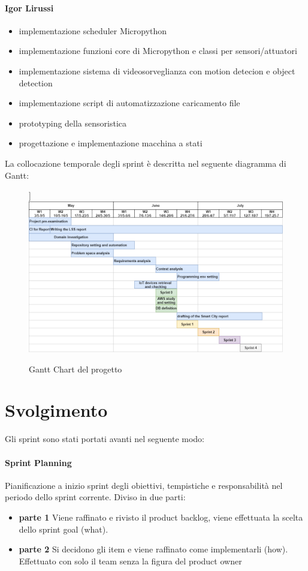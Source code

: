 \paragraph{Igor Lirussi}
\begin{itemize}
    \item implementazione scheduler Micropython
    \item implementazione funzioni core di Micropython e classi per sensori/attuatori
    \item implementazione sistema di videosorveglianza con motion detecion e object detection
    \item implementazione script di automatizzazione caricamento file
    \item prototyping della sensoristica
    \item progettazione e implementazione macchina a stati 
\end{itemize}
La collocazione temporale degli sprint è descritta nel seguente diagramma di Gantt: 
\begin{figure}[H]
    \caption{Gantt Chart del progetto}
    \label{fig:Gantt}] 
    \centering
   \includegraphics[width=1\textwidth]{DrawIo/GanttChart.png}
\end{figure}

\section{Svolgimento}
Gli sprint sono stati portati avanti nel seguente modo:
    \paragraph{Sprint Planning}
        Pianificazione a inizio sprint degli obiettivi, tempistiche e responsabilità nel periodo dello sprint corrente. Diviso in due parti:
        \begin{itemize}
        \item\textbf{parte 1} 
            Viene raffinato e rivisto il product backlog, viene effettuata la scelta dello sprint goal (what).
        \item\textbf{parte 2}
            Si decidono gli item e viene raffinato come implementarli (how). Effettuato con solo il team senza la figura del product owner
        \end{itemize}
